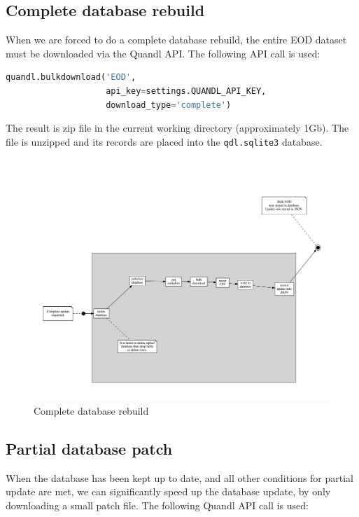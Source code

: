\documentclass[8pt,oneside]{book}
\begin{document}
\subsection{Complete database rebuild}

When we are forced to do a complete database rebuild, the entire EOD dataset must be downloaded via
the Quandl API. The following API call is used:

\begin{lstlisting}[language=Python]
quandl.bulkdownload('EOD',
                    api_key=settings.QUANDL_API_KEY,
                    download_type='complete')
\end{lstlisting}

The result is zip file in the current working directory (approximately 1Gb). The file is unzipped and its
records are
placed into the \texttt{qdl.sqlite3} database.

\begin{figure}
    \center
    \caption{Complete database rebuild}
    \includegraphics[scale=0.3]{complete}
\end{figure}

\subsection{Partial database patch}

When the database has been kept up to date, and all other conditions for partial update are met,
we can significantly speed up the database update, by only downloading a small patch file. The following
Quandl API call is used:
\end{document}
